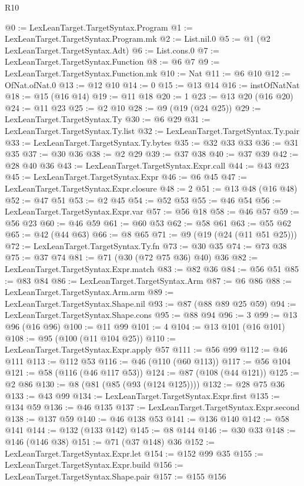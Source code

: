 \begin{lexlean}{R10}
\begin{coremodule}
@0 := LexLeanTarget.TargetSyntax.Program
@1 := LexLeanTarget.TargetSyntax.Program.mk
@2 := List.nil.{0}
@5 := @1 (@2 LexLeanTarget.TargetSyntax.Adt)
@6 := List.cons.{0}
@7 := LexLeanTarget.TargetSyntax.Function
@8 := @6 @7
@9 := LexLeanTarget.TargetSyntax.Function.mk
@10 := Nat
@11 := @6 @10
@12 := OfNat.ofNat.{0}
@13 := @12 @10
@14 := 0
@15 := @13 @14
@16 := instOfNatNat
@18 := @15 (@16 @14)
@19 := @11 @18
@20 := 1
@23 := @13 @20 (@16 @20)
@24 := @11 @23
@25 := @2 @10
@28 := @9 (@19 (@24 @25))
@29 := LexLeanTarget.TargetSyntax.Ty
@30 := @6 @29
@31 := LexLeanTarget.TargetSyntax.Ty.list
@32 := LexLeanTarget.TargetSyntax.Ty.pair
@33 := LexLeanTarget.TargetSyntax.Ty.bytes
@35 := @32 @33 @33
@36 := @31 @35
@37 := @30 @36
@38 := @2 @29
@39 := @37 @38
@40 := @37 @39
@42 := @28 @40 @36
@43 := LexLeanTarget.TargetSyntax.Expr.call
@44 := @43 @23
@45 := LexLeanTarget.TargetSyntax.Expr
@46 := @6 @45
@47 := LexLeanTarget.TargetSyntax.Expr.closure
@48 := 2
@51 := @13 @48 (@16 @48)
@52 := @47 @51
@53 := @2 @45
@54 := @52 @53
@55 := @46 @54
@56 := LexLeanTarget.TargetSyntax.Expr.var
@57 := @56 @18
@58 := @46 @57
@59 := @56 @23
@60 := @46 @59
@61 := @60 @53
@62 := @58 @61
@63 := @55 @62
@65 := @42 (@44 @63)
@66 := @8 @65
@71 := @9 (@19 (@24 (@11 @51 @25)))
@72 := LexLeanTarget.TargetSyntax.Ty.fn
@73 := @30 @35
@74 := @73 @38
@75 := @37 @74
@81 := @71 (@30 (@72 @75 @36) @40) @36
@82 := LexLeanTarget.TargetSyntax.Expr.match
@83 := @82 @36
@84 := @56 @51
@85 := @83 @84
@86 := LexLeanTarget.TargetSyntax.Arm
@87 := @6 @86
@88 := LexLeanTarget.TargetSyntax.Arm.arm
@89 := LexLeanTarget.TargetSyntax.Shape.nil
@93 := @87 (@88 @89 @25 @59)
@94 := LexLeanTarget.TargetSyntax.Shape.cons
@95 := @88 @94
@96 := 3
@99 := @13 @96 (@16 @96)
@100 := @11 @99
@101 := 4
@104 := @13 @101 (@16 @101)
@108 := @95 (@100 (@11 @104 @25))
@110 := LexLeanTarget.TargetSyntax.Expr.apply @57
@111 := @56 @99
@112 := @46 @111
@113 := @112 @53
@116 := @46 (@110 (@60 @113))
@117 := @56 @104
@121 := @58 (@116 (@46 @117 @53))
@124 := @87 (@108 (@44 @121))
@125 := @2 @86
@130 := @8 (@81 (@85 (@93 (@124 @125))))
@132 := @28 @75 @36
@133 := @43 @99
@134 := LexLeanTarget.TargetSyntax.Expr.first
@135 := @134 @59
@136 := @46 @135
@137 := LexLeanTarget.TargetSyntax.Expr.second
@138 := @137 @59
@140 := @46 @138 @53
@141 := @136 @140
@142 := @58 @141
@144 := @132 (@133 @142)
@145 := @8 @144
@146 := @30 @33
@148 := @146 (@146 @38)
@151 := @71 (@37 @148) @36
@152 := LexLeanTarget.TargetSyntax.Expr.let
@154 := @152 @99 @35
@155 := LexLeanTarget.TargetSyntax.Expr.build
@156 := LexLeanTarget.TargetSyntax.Shape.pair
@157 := @155 @156

\end{coremodule}
\end{lexlean}
